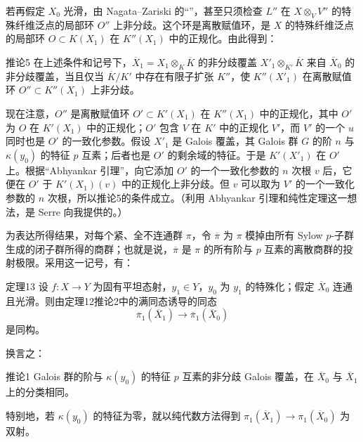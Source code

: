 若再假定 $X_0$ 光滑，由 Nagata--Zariski 的“”，甚至只须检查 $L''$ 在 $X\otimes_VV''$ 的特殊纤维泛点的局部环 $O''$ 上非分歧。这个环是离散赋值环，是 $X$ 的特殊纤维泛点的局部环 $O\subset K(X_1)$ 在 $K''(X_1)$ 中的正规化。由此得到：
\begin{statement}{推论5}
在上述条件和记号下，$\overline X_1=X_1\otimes_K\overline K$ 的非分歧覆盖 $X'_1\otimes_{K'}\overline K$ 来自 $\overline X_0$ 的非分歧覆盖，当且仅当 $\overline K/K'$ 中存在有限子扩张 $K''$，使 $K''(X'_1)$ 在离散赋值环 $O''\subset K''(X_1)$ 上非分歧。
\end{statement}
现在注意，$O''$ 是离散赋值环 $O'\subset K'(X_1)$ 在 $K''(X_1)$ 中的正规化，其中 $O'$ 为 $O$ 在 $K'(X_1)$ 中的正规化；$O'$ 包含 $V$ 在 $K'$ 中的正规化 $V'$，而 $V'$ 的一个 $u$ 同时也是 $O'$ 的一致化参数。假设 $X'_1$ 是 Galois 覆盖，其 Galois 群 $G$ 的阶 $n$ 与 $\kappa(y_0)$ 的特征 $p$ 互素；后者也是 $O'$ 的剩余域的特征。于是 $K'(X'_1)$ 在 $O'$ 上。根据“Abhyankar 引理”，向它添加 $O'$ 的一个一致化参数的 $n$ 次根 $v$ 后，它便在 $O'$ 于 $K'(X_1)(v)$ 中的正规化上非分歧。但 $v$ 可以取为 $V'$ 的一个一致化参数的 $n$ 次根，所以推论5的条件成立。（利用 Abhyankar 引理和纯性定理这一想法，是 Serre 向我提供的。）

为表达所得结果，对每个紧、全不连通群 $\pi$，令 $\overline\pi$ 为 $\pi$ 模掉由所有 Sylow $p$-子群生成的闭子群所得的商群；也就是说，$\overline\pi$ 是 $\pi$ 的所有阶与 $p$ 互素的离散商群的投射极限。采用这一记号，有：
\begin{statement}{定理13}
设 $f:X\to Y$ 为固有平坦态射，$y_1\in Y$，$y_0$ 为 $y_1$ 的特殊化；假定 $\overline X_0$ 连通且光滑。则由定理12推论2中的满同态诱导的同态
\[
\overline\pi_1(\overline X_1)\longrightarrow\overline\pi_1(\overline X_0)
\]
是同构。
\end{statement}

换言之：
\begin{statement}{推论1}
Galois 群的阶与 $\kappa(y_0)$ 的特征 $p$ 互素的非分歧 Galois 覆盖，在 $\overline X_0$ 与 $\overline X_1$ 上的分类相同。
\end{statement}
特别地，若 $\kappa(y_0)$ 的特征为零，就以纯代数方法得到 $\pi_1(\overline X_1)\to\pi_1(\overline X_0)$ 为双射。

